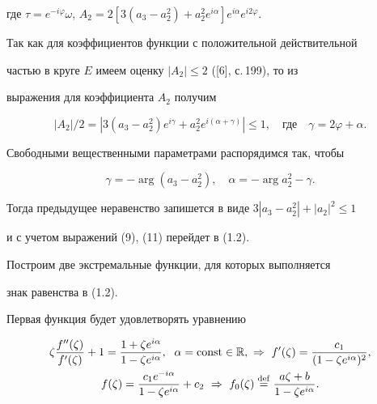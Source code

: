 где $\tau=e^{-i\varphi}\omega$, $A_2=2[3(a_3-a^2_2)+a^2_2 


e^{i\alpha}]e^{i\alpha}e^{i2\varphi}$. 


 


Так как для коэффициентов функции с положительной действительной 


частью в круге $E$ имеем оценку $|A_2|\le2$ ([6], с.\,199), то из 


выражения для коэффициента $A_2$ получим 


$$ 


|A_2|/2=|3(a_3-a^2_2)e^{i\gamma}


+a^2_2e^{i(\alpha+\gamma)}|\le1,\quad 


\text{где} \quad \gamma=2\varphi+\alpha. 


$$ 


Свободными вещественными параметрами распорядимся так, чтобы 


$$ 


\gamma=-\arg(a_3-a^2_2),\quad 


\alpha=-\arg a^2_2-\gamma. 


$$ 


Тогда предыдущее неравенство запишется в виде $3|a_3-a^2_2|+|a_2|^2\le1$ 


и с учетом выражений (9), (11) перейдет в (1.2). 


 


Построим две экстремальные функции, для которых выполняется 


знак равенства в (1.2). 


 


Первая функция будет удовлетворять уравнению 


\begin{gather*} 


\zeta\frac{f''(\zeta)}{f'(\zeta)}+1= 


\frac{1+\zeta e^{i\alpha}}{1-\zeta e^{i\alpha}},\ \; 


\alpha=\const\in\Bbb R,\ \Rightarrow \ f'(\zeta)= 


\frac{c_1}{(1-\zeta e^{i\alpha})^2}, \\ 


% 


f(\zeta)=\frac{c_1e^{-i\alpha}}{1-\zeta e^{i\alpha}}+c_2 


\ \Rightarrow\ f_0(\zeta)\eqdef \frac{a\zeta+b} 


{1-\zeta e^{i\alpha}}. 


\end{gather*} 


